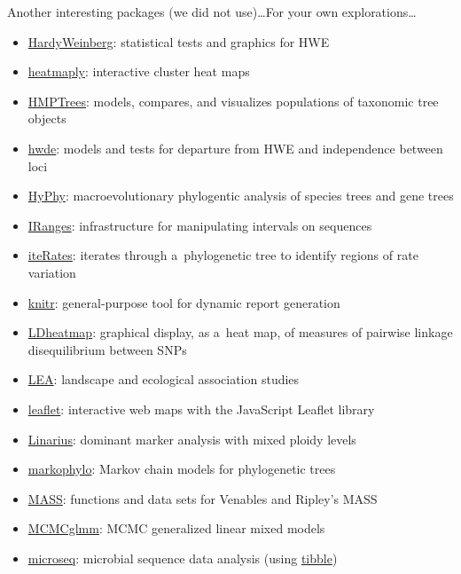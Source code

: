 \documentclass[compress, ucs, xelatex, 11pt, xcolor=svgnames, aspectratio=169,
	hyperref={
		bookmarks=true,
		unicode=true,
		colorlinks=true,
		pdftitle={Molecular data in R},
		plainpages=false,
		pdfauthor={Vojtech Zeisek},
		pdfsubject={Course about phylogeny and evolution in R},
		pdfcreator={XeLaTeX},
		pdfkeywords={R, evolution, phylogeny, molecular data},
		linkcolor=Crimson, %
		anchorcolor=Magenta, %
		citecolor=Magenta, %
		filecolor=Magenta, %
		menucolor=Magenta, %
		urlcolor=DodgerBlue, %
		pdftex},
	url={hyphens, lowtilde} %
	]{beamer}
\begin{document}
\begin{frame}[allowframebreaks]{Another interesting packages (we did not use)\ldots}{For your own explorations\ldots}
\begin{itemize}
		\item \href{https://CRAN.R-project.org/package=HardyWeinberg}{HardyWeinberg}: statistical tests and graphics for HWE
		\item \href{https://CRAN.R-project.org/package=heatmaply}{heatmaply}: interactive cluster heat maps
		\item \href{https://CRAN.R-project.org/package=HMPTrees}{HMPTrees}: models, compares, and visualizes populations of taxonomic tree objects
		\item \href{https://CRAN.R-project.org/package=hwde}{hwde}: models and tests for departure from HWE and independence between loci
		\item \href{https://CRAN.R-project.org/package=HyPhy}{HyPhy}: macroevolutionary phylogentic analysis of species trees and gene trees
		\item \href{https://bioconductor.org/packages/release/bioc/html/IRanges.html}{IRanges}: infrastructure for manipulating intervals on sequences
		\item \href{https://CRAN.R-project.org/package=iteRates}{iteRates}: iterates through a~phylogenetic tree to identify regions of rate variation
		\item \href{https://CRAN.R-project.org/package=knitr}{knitr}: general-purpose tool for dynamic report generation
		\item \href{https://CRAN.R-project.org/package=LDheatmap}{LDheatmap}: graphical display, as a~heat map, of measures of pairwise linkage disequilibrium between SNPs
		\item \href{https://www.bioconductor.org/packages/release/bioc/html/LEA.html}{LEA}: landscape and ecological association studies
		\item \href{https://CRAN.R-project.org/package=leaflet}{leaflet}: interactive web maps with the JavaScript Leaflet library
		\item \href{https://github.com/giby/Linarius}{Linarius}: dominant marker analysis with mixed ploidy levels
		\item \href{https://CRAN.R-project.org/package=markophylo}{markophylo}: Markov chain models for phylogenetic trees
		\item \href{https://CRAN.R-project.org/package=MASS}{MASS}: functions and data sets for Venables and Ripley's MASS
		\item \href{https://CRAN.R-project.org/package=MCMCglmm}{MCMCglmm}: MCMC generalized linear mixed models
		\item \href{https://CRAN.R-project.org/package=microseq}{microseq}: microbial sequence data analysis (using \href{https://CRAN.R-project.org/package=tibble}{tibble})

\end{itemize}
\end{frame}
\end{document}
